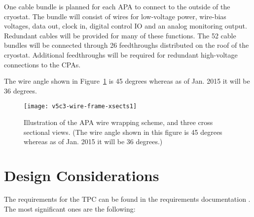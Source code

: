 One cable bundle is planned for each APA to connect to the outside of the cryostat. The bundle will consist of wires for low-voltage power, wire-bias voltages, data out, clock in, digital control IO and an analog monitoring output. Redundant cables will be provided for many of these functions. The 52 cable bundles will be connected through 26 feedthroughs distributed on the roof of the cryostat. Additional feedthroughs will be required for redundant high-voltage connections to the CPAs. 


\begin{editornote}
The wire angle shown in Figure~\ref{fig:tpc-wire-frame-xsect} is 45 degrees whereas as of Jan. 2015 it will be 36 degrees. \end{editornote}


\begin{figure}[htpb]
\centering
\texttt{[image: v5c3-wire-frame-xsects1]}
\caption[Illustration of the APA wire wrapping scheme]{Illustration of the APA wire wrapping scheme, and three cross sectional views. (The wire angle shown in this figure is 45 degrees whereas as of Jan. 2015 it will be 36 degrees.)} 
\label{fig:tpc-wire-frame-xsect}
\end{figure}

\section{Design Considerations} 
\label{sec:v5-tpc-reqs-n-specs}

The requirements for the TPC can be found in the requirements documentation \cite{lar-fd-req}. The most significant ones are the following:

